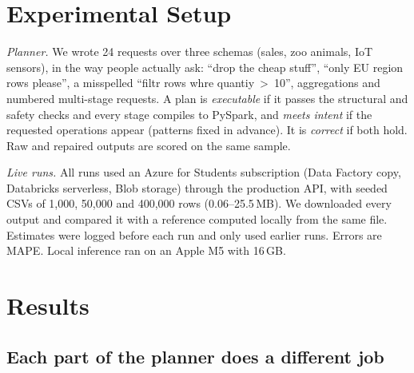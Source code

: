 \documentclass[runningheads]{llncs}
\begin{document}
\section{Experimental Setup}

\emph{Planner.} We wrote 24 requests over three schemas (sales, zoo animals, IoT sensors), in the
way people actually ask: ``drop the cheap stuff'', ``only EU region rows please'', a misspelled
``filtr rows whre quantiy~>~10'', aggregations and numbered multi-stage requests. A plan is
\emph{executable} if it passes the structural and safety checks and every stage compiles to
PySpark, and \emph{meets intent} if the requested operations appear (patterns fixed in advance).
It is \emph{correct} if both hold. Raw and repaired outputs are scored on the same sample.

\emph{Live runs.} All runs used an Azure for Students subscription (Data Factory copy,
Databricks serverless, Blob storage) through the production API, with seeded CSVs of 1{,}000,
50{,}000 and 400{,}000 rows (0.06--25.5\,MB). We downloaded every output and compared it with a
reference computed locally from the same file. Estimates were logged before each run and only
used earlier runs. Errors are MAPE. Local inference ran on an Apple M5 with 16\,GB.

\section{Results}

\subsection{Each part of the planner does a different job}
\label{sec:planner}
\end{document}
